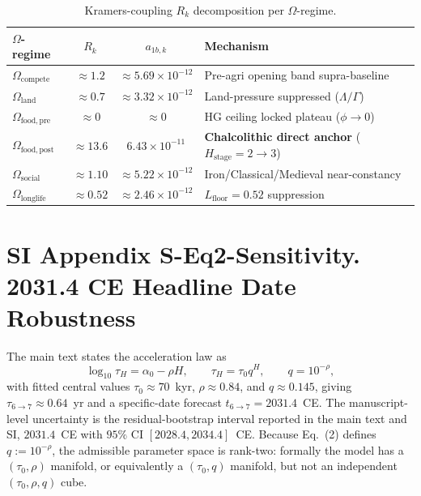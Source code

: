 \documentclass[11pt]{article}
\begin{document}

\begin{table}[h]
\centering
\small
\caption{Kramers-coupling $R_k$ decomposition per $\Omega$-regime.}
\label{tab:a1b_kramers_6regime}
\begin{tabular}{lccl}
\toprule
$\Omega$-regime & $R_k$ & $a_{1b,k}$ & Mechanism \\
\midrule
$\Omega_{\mathrm{compete}}$      & ${\approx}1.2$   & ${\approx}5.69\times 10^{-12}$ & Pre-agri opening band supra-baseline \\
$\Omega_{\mathrm{land}}$         & ${\approx}0.7$   & ${\approx}3.32\times 10^{-12}$ & Land-pressure suppressed ($\Lambda/\Gamma$) \\
$\Omega_{\mathrm{food,pre}}$     & ${\approx}0$     & ${\approx}0$                    & HG ceiling locked plateau ($\phi\to 0$) \\
$\Omega_{\mathrm{food,post}}$    & ${\approx}13.6$  & $6.43\times 10^{-11}$           & \textbf{Chalcolithic direct anchor} ($H_{\mathrm{stage}}=2\to 3$) \\
$\Omega_{\mathrm{social}}$       & ${\approx}1.10$  & ${\approx}5.22\times 10^{-12}$ & Iron/Classical/Medieval near-constancy \\
$\Omega_{\mathrm{longlife}}$     & ${\approx}0.52$  & ${\approx}2.46\times 10^{-12}$ & $L_{\mathrm{floor}}=0.52$ suppression \\
\bottomrule
\end{tabular}
\end{table}



\section*{SI Appendix S-Eq2-Sensitivity. 2031.4 CE Headline Date Robustness}
\label{sec:S-Eq2-Sensitivity}

The main text states the acceleration law as
\[\log_{10}\tau_H=\alpha_0-\rho H,\qquad\tau_H=\tau_0 q^H,\qquad q=10^{-\rho},\]
with fitted central values $\tau_0\approx 70$~kyr, $\rho\approx 0.84$, and
$q\approx 0.145$, giving $\tau_{6\to 7}\approx 0.64$~yr and a specific-date
forecast $t_{6\to 7}=2031.4$~CE. The manuscript-level uncertainty is the
residual-bootstrap interval reported in the main text and SI,
$2031.4$~CE with $95\%$ CI $[2028.4,2034.4]$~CE. Because Eq.~(2) defines
$q:=10^{-\rho}$, the admissible parameter space is rank-two: formally the
model has a $(\tau_0,\rho)$ manifold, or equivalently a $(\tau_0,q)$
manifold, but not an independent $(\tau_0,\rho,q)$ cube.
\end{document}
